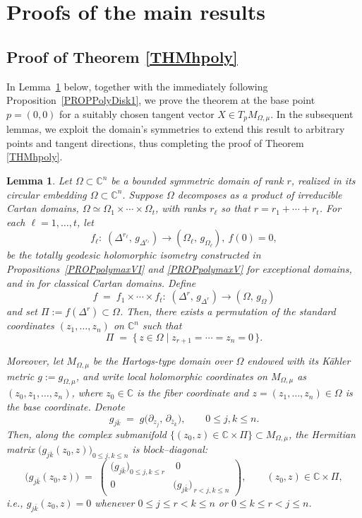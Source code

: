 \documentclass[reqno, 11pt]{amsart}
\newtheorem{lemma}[theor]{Lemma}
\newcommand{\W}{\Omega}
\begin{document}
\section{Proofs of the main results}

\subsection{Proof of Theorem \ref{THMhpoly}}
\noindent
\noindent
In Lemma~\ref{lemtotgroos} below, together with the immediately following Proposition~\ref{PROPPolyDisk1}, we prove the theorem at the base point \(p=(0,0)\) for a suitably chosen tangent vector \(X\in T_pM_{\Omega,\mu}\).  In the subsequent lemmas, we exploit the domain’s symmetries to extend this result to arbitrary points and tangent directions, thus completing the proof of Theorem \ref{THMhpoly}.
\begin{lemma}\label{lemtotgroos}
Let $\Omega\subset\mathbb{C}^n$ be a bounded symmetric domain of rank $r$, realized in its circular embedding $\W\subset\mathbb{C}^n$. Suppose $\Omega$ decomposes as a product of irreducible Cartan domains, $\Omega\simeq\Omega_1\times\cdots\times\Omega_t$, with ranks $r_\ell$ so that $r=r_1+\cdots+r_t$.
For each $\ell=1,\dots,t$, let
$$
f_\ell:\; (\Delta^{r_\ell},\,g_{\Delta^{r_\ell}})\longrightarrow (\W_\ell,\,g_{\Omega_\ell}),\  f(0)=0,
$$
be the  totally geodesic holomorphic isometry constructed in Propositions~\ref{PROPpolymaxVI} and \ref{PROPpolymaxV} for exceptional domains, and in \cite[Sec.~2]{MOSSAZEDDA2022polch} for classical  Cartan domains. 
Define
\begin{equation}\label{eq:fnsdjfgns2}
f\;=\;f_1\times\cdots\times f_t:\;(\Delta^{r},\,g_{\Delta^{r}})\longrightarrow (\W,\,g_{\Omega})
\end{equation}
and set $\Pi:= f(\Delta^r)\subset\W$.
Then, there exists a permutation of the standard coordinates $(z_1,\dots,z_n)$ on $\mathbb{C}^n$ such that
\[
\Pi \;=\; \bigl\{\,z\in\Omega \;\big|\; z_{r+1}=\cdots=z_{n}=0\,\bigr\}.
\]

Moreover, let $M_{\Omega,\mu}$ be the Hartogs-type domain over $\Omega$ endowed with its Kähler metric $g:= g_{{\Omega,\mu}}$, and write local holomorphic coordinates on $M_{\Omega,\mu}$ as $(z_0,z_1,\dots,z_n)$, where $z_0\in\mathbb{C}$ is the fiber coordinate and $z=(z_1,\dots,z_n)\in\W$ is the base coordinate. Denote
\[
g_{j\bar k}\;=\; g\!\bigl(\partial_{z_j},\,\partial_{\bar z_k}\bigr),\qquad 0\le j,k\le n.
\]
Then, along the complex submanifold $\{(z_0,z)\in\mathbb{C}\times\Pi\}\subset M_{\Omega,\mu}$, the Hermitian matrix $\bigl(g_{j\bar k}(z_0,z)\bigr)_{0\le j,k\le n}$ is block–diagonal:
\begin{equation}\label{eqgjk=0roos}
\bigl(g_{j\bar k}(z_{0},z)\bigr)\;=\;
\begin{pmatrix}
\bigl(g_{j\bar k}\bigr)_{0\le j,k\le r} & \;0\\[6pt]
0 & \bigl(g_{j\bar k}\bigr)_{\,r<j,k\le n}
\end{pmatrix},
\qquad (z_0,z)\in\mathbb{C}\times\Pi,
\end{equation}
i.e., $g_{j\bar k}(z_0,z)=0$ whenever $0\le j\le r<k\le n$ or $0\le k\le r<j\le n$.
\end{lemma}
\end{document}
